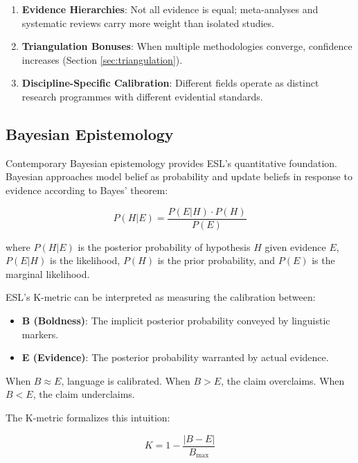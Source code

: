 \documentclass[11pt,a4paper]{article}
\begin{document}
\begin{enumerate}
    \item \textbf{Evidence Hierarchies}: Not all evidence is equal; meta-analyses and systematic reviews carry more weight than isolated studies.
    \item \textbf{Triangulation Bonuses}: When multiple methodologies converge, confidence increases (Section \ref{sec:triangulation}).
    \item \textbf{Discipline-Specific Calibration}: Different fields operate as distinct research programmes with different evidential standards.
\end{enumerate}

\subsection{Bayesian Epistemology}

Contemporary Bayesian epistemology \citep{Howson1989, Earman1992} provides ESL's quantitative foundation. Bayesian approaches model belief as probability and update beliefs in response to evidence according to Bayes' theorem:

\begin{equation}
P(H|E) = \frac{P(E|H) \cdot P(H)}{P(E)}
\label{eq:bayes}
\end{equation}

where $P(H|E)$ is the posterior probability of hypothesis $H$ given evidence $E$, $P(E|H)$ is the likelihood, $P(H)$ is the prior probability, and $P(E)$ is the marginal likelihood.

\begin{keyinsight}[title={Bayesian Foundation of ESL}]
ESL's K-metric can be interpreted as measuring the calibration between:
\begin{itemize}
    \item \textbf{B (Boldness)}: The implicit posterior probability conveyed by linguistic markers.
    \item \textbf{E (Evidence)}: The posterior probability warranted by actual evidence.
\end{itemize}

When $B \approx E$, language is calibrated. When $B > E$, the claim overclaims. When $B < E$, the claim underclaims.
\end{keyinsight}

The K-metric formalizes this intuition:

\begin{equation}
K = 1 - \frac{|B - E|}{B_{\max}}
\label{eq:k-metric-intro}
\end{equation}
\end{document}
